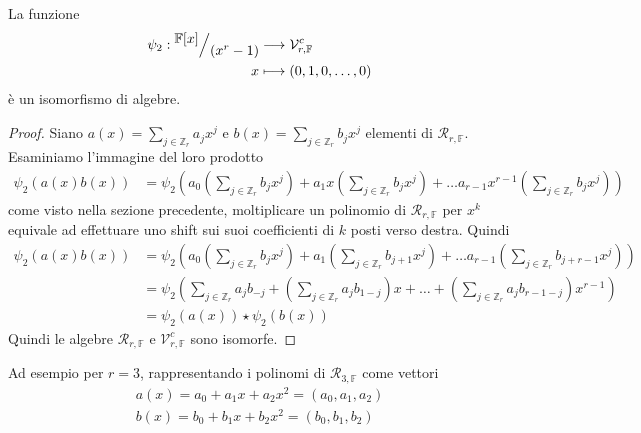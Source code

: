 \begin{prop}
La funzione
\begin{align*}
\psi_{2}: \quotient{ \mathbb{F}[x] }{ (x^r -1 )}
          &\longrightarrow
          \mathcal{V}_{r,\mathbb{F} }^{c}  \\
              x
              &\longmapsto
              (0,1,0,\dots , 0)
\end{align*}
è un isomorfismo di algebre.
\end{prop}

\begin{proof}
Siano $a(x) = \sum_{j \in \mathbb{Z}_{r} }a_{j} x^{j}$ e $b(x)= \sum_{j \in
\mathbb{Z}_{r} } b_{j} x^{j}$ elementi di $\mathcal{R}_{r, \mathbb{F}} $.
Esaminiamo l'immagine del loro prodotto
\begin{align*}
\psi_{2}(a(x)b(x))
&= \psi_{2}(
a_{0}(\sum_{j \in \mathbb{Z}_{r} } b_{j} x^{j}) +
a_{1}x(\sum_{j \in \mathbb{Z}_{r} } b_{j} x^{j}) +
\dots
a_{r-1}x^{r-1}(\sum_{j \in \mathbb{Z}_{r} } b_{j} x^{j})
)
\end{align*}
come visto nella sezione precedente, moltiplicare un polinomio di
$\mathcal{R}_{r, \mathbb{F}}$ per $x^k$ equivale ad effettuare uno shift sui
suoi coefficienti
di $k$ posti verso destra. Quindi
\begin{align*}
\psi_{2}(a(x)b(x))
&= \psi_{2}(
a_{0}(\sum_{j \in \mathbb{Z}_{r} } b_{j} x^{j}) +
a_{1}(\sum_{j \in \mathbb{Z}_{r} } b_{j+1} x^{j}) +
\dots
a_{r-1}(\sum_{j \in \mathbb{Z}_{r} } b_{j+r-1} x^{j})
)
\\
&=
\psi_{2}(
\sum_{j \in \mathbb{Z}_{r} } a_{j} b_{-j} +
(\sum_{j \in \mathbb{Z}_{r} } a_{j} b_{1-j})x +
\dots +
(\sum_{j \in \mathbb{Z}_{r} } a_{j} b_{r-1-j})x^{r-1}) \\
&=\psi_{2}(a(x)) \star \psi_{2}(b(x))
\end{align*}
Quindi le algebre $\mathcal{R}_{r, \mathbb{F}}$ e $\mathcal{V}_{r,
\mathbb{F}}^{c}$ sono isomorfe.
\end{proof}
Ad esempio per $r = 3$, rappresentando i polinomi di $\mathcal{R}_{3,
\mathbb{F}} $ come vettori
\begin{align*}
 a(x) = a_{0} + a_{1}x+ a_{2}x^2 = (a_{0}, a_{1},a_{2})
 \\
 b(x) = b_{0} + b_{1}x+ b_{2}x^2 = (b_{0}, b_{1},b_{2})
\end{align*}
